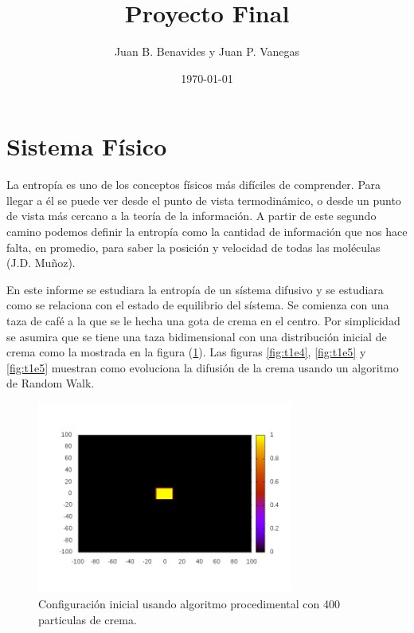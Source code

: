 \documentclass[12pt,twocolumn]{article}
\title{Proyecto Final}
\author{Juan B. Benavides y Juan P. Vanegas }
\date{\today}
\begin{document}
\maketitle

\section{\label{sec: Intro} Sistema Físico}
La entropía es uno de los conceptos físicos más difíciles de comprender. Para llegar a 
él se puede ver desde el punto de vista termodinámico, o desde un punto de vista más 
cercano a la teoría de la información. A partir de este segundo camino podemos definir la 
entropía como la cantidad de información que nos hace falta, en promedio, para saber la posición 
y velocidad de todas las moléculas (J.D. Muñoz). 

En este informe se estudiara la entropía de un sístema difusivo y se estudiara como se relaciona 
con el estado de equilibrio del sístema. Se comienza con una taza de café a la que se le hecha una 
gota de crema en el centro. Por simplicidad se asumira que se tiene una taza bidimensional con una 
distribución inicial de crema como la mostrada en la figura (\ref{fig:t0}). Las figuras \ref{fig:t1e4}, 
\ref{fig:t1e5} y \ref{fig:t1e5} muestran como evoluciona la difusión de la crema usando un algoritmo de 
Random Walk.

\begin{figure}
    \centering
    \includegraphics[width=0.75\textwidth]{figs/t_0.png}
    \caption{Configuración inicial usando algoritmo procedimental con 400 particulas de crema.}
    \label{fig:t0}
\end{figure}
\end{document}
